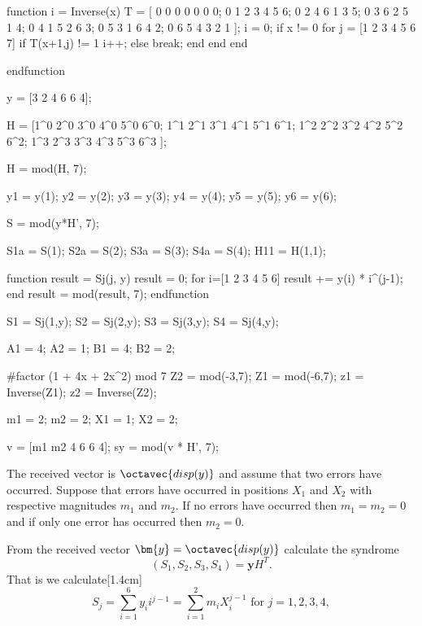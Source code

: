\begin{octavecode}
	function i = Inverse(x)
	  T = [
	      0 0 0 0 0 0 0;
	      0 1 2 3 4 5 6;
	      0 2 4 6 1 3 5;
	      0 3 6 2 5 1 4;
	      0 4 1 5 2 6 3;
	      0 5 3 1 6 4 2;
	      0 6 5 4 3 2 1
	    ];
	  i = 0;	
	  if x != 0
	    for j = [1 2 3 4 5 6 7]
	      if T(x+1,j) != 1
	        i++;
	      else
	        break;
	      end
	    end 
	  end
	  
	endfunction
	
	y = [3 2 4 6 6 4];
	
	
	H = [1^0 2^0 3^0 4^0 5^0 6^0;
	     1^1 2^1 3^1 4^1 5^1 6^1;
	     1^2 2^2 3^2 4^2 5^2 6^2;
	     1^3 2^3 3^3 4^3 5^3 6^3
	    ];
	
	H  = mod(H, 7);
	
	y1 = y(1);
	y2 = y(2);
	y3 = y(3);
	y4 = y(4);
	y5 = y(5);
	y6 = y(6);
	
	S = mod(y*H', 7);
	
	S1a = S(1);
	S2a = S(2);
	S3a = S(3);
	S4a = S(4);
	H11 = H(1,1);
	
	function result =  Sj(j, y)
		result = 0;
		for i=[1 2 3 4 5 6]
			result += y(i) * i^(j-1);
		end
		result = mod(result, 7);
	endfunction
	
	S1 = Sj(1,y);
	S2 = Sj(2,y);
	S3 = Sj(3,y);
	S4 = Sj(4,y);
	
	A1 = 4;
	A2 = 1;
	B1 = 4;
	B2 = 2;
	
	#factor (1 + 4x + 2x^2) mod 7
	Z2 = mod(-3,7);
	Z1 = mod(-6,7);
	z1 = Inverse(Z1);
	z2 = Inverse(Z2);
	
	m1 = 2;
	m2 = 2;
	X1 = 1;
	X2 = 2;
	
	v = [m1 m2 4 6 6 4];
	sy = mod(v * H', 7);
\end{octavecode}
The received vector is $\octavec{disp(y)}$ and assume that two errors have occurred.
Suppose that errors have occurred in positions $X_1$ and $X_2$ with respective magnitudes $m_1$ and $m_2$.  If no errors have occurred then $m_1 = m_2 = 0$ and if only one error has occurred then $m_2=0$.

From the received vector $\bm{y} = \octavec{disp(y)}$ calculate the syndrome
\[
	(S_1,S_2,S_3,S_4) = \bm{y}H^T.
\]
That is we calculate[1.4cm]
\begin{equation}
	\label{eq:2.1}
	S_j = \sum_{i=1}^6 y_i i^{j-1} = \sum_{i=1}^2 m_i X_i^{j-1} \textrm{ for } j=1,2,3,4,
\end{equation}

